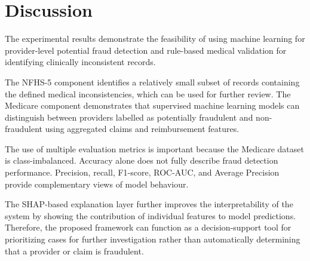 \section{Discussion}

The experimental results demonstrate the feasibility of using machine learning for provider-level potential fraud detection and rule-based medical validation for identifying clinically inconsistent records.

The NFHS-5 component identifies a relatively small subset of records containing the defined medical inconsistencies, which can be used for further review. The Medicare component demonstrates that supervised machine learning models can distinguish between providers labelled as potentially fraudulent and non-fraudulent using aggregated claims and reimbursement features.

The use of multiple evaluation metrics is important because the Medicare dataset is class-imbalanced. Accuracy alone does not fully describe fraud detection performance. Precision, recall, F1-score, ROC-AUC, and Average Precision provide complementary views of model behaviour.

The SHAP-based explanation layer further improves the interpretability of the system by showing the contribution of individual features to model predictions. Therefore, the proposed framework can function as a decision-support tool for prioritizing cases for further investigation rather than automatically determining that a provider or claim is fraudulent.
 
